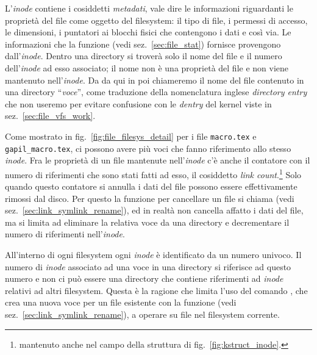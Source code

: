 \begin{enumerate*}
  
\item L'\textit{inode} contiene i cosiddetti \textsl{metadati}, vale dire le
  informazioni riguardanti le proprietà del file come oggetto del filesystem:
  il tipo di file, i permessi di accesso, le dimensioni, i puntatori ai
  blocchi fisici che contengono i dati e così via. Le informazioni che la
  funzione  (vedi sez.~\ref{sec:file_stat}) fornisce provengono
  dall'\textit{inode}.  Dentro una directory si troverà solo il nome del file
  e il numero dell'\textit{inode} ad esso associato; il nome non è una
  proprietà del file e non viene mantenuto nell'\textit{inode}. Da da qui in
  poi chiameremo il nome del file contenuto in una directory
  ``\textsl{voce}'', come traduzione della nomenclatura inglese
  \textit{directory entry} che non useremo per evitare confusione con le
  \textit{dentry} del kernel viste in sez.~\ref{sec:file_vfs_work}.
  
\item Come mostrato in fig.~\ref{fig:file_filesys_detail} per i file
  \texttt{macro.tex} e \texttt{gapil\_macro.tex}, ci possono avere più voci
  che fanno riferimento allo stesso \textit{inode}. Fra le proprietà di un
  file mantenute nell'\textit{inode} c'è anche il contatore con il numero di
  riferimenti che sono stati fatti ad esso, il cosiddetto \textit{link
    count}.\footnote{mantenuto anche nel campo  della struttura
     di fig.~\ref{fig:kstruct_inode}.}  Solo quando questo
  contatore si annulla i dati del file possono essere effettivamente rimossi
  dal disco. Per questo la funzione per cancellare un file si chiama
   (vedi sez.~\ref{sec:link_symlink_rename}), ed in realtà non
  cancella affatto i dati del file, ma si limita ad eliminare la relativa voce
  da una directory e decrementare il numero di riferimenti
  nell'\textit{inode}.
  
\item All'interno di ogni filesystem ogni \textit{inode} è identificato da un
  numero univoco. Il numero di \textit{inode} associato ad una voce in una
  directory si riferisce ad questo numero e non ci può essere una directory
  che contiene riferimenti ad \textit{inode} relativi ad altri filesystem.
  Questa è la ragione che limita l'uso del comando , che crea una
  nuova voce per un file esistente con la funzione  (vedi
  sez.~\ref{sec:link_symlink_rename}), a operare su file nel filesystem
  corrente.
  

\end{enumerate*}
